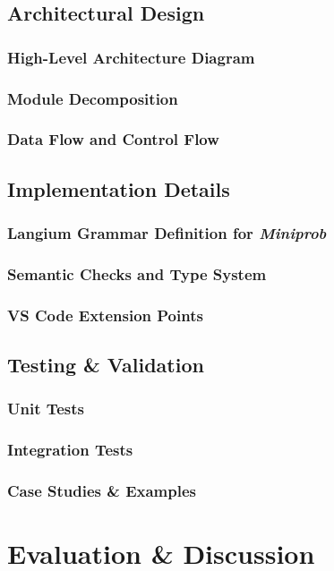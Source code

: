 \documentclass[11pt]{report}
\begin{document}
\chapter{Architectural Design}
\section{High-Level Architecture Diagram}
\section{Module Decomposition}
\section{Data Flow and Control Flow}

\chapter{Implementation Details}
\label{sec:langium-grammar}
\section{Langium Grammar Definition for \textit{Miniprob}}
\section{Semantic Checks and Type System}
\section{VS Code Extension Points}

\chapter{Testing \& Validation}
\section{Unit Tests}
\section{Integration Tests}
\section{Case Studies \& Examples}

\part{Evaluation \& Discussion}
\end{document}
